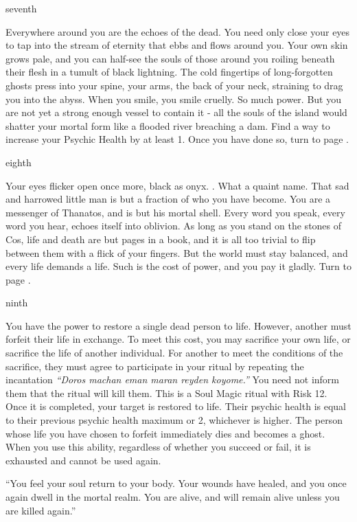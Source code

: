 \documentclass[greennotebook]{Kos}
\begin{document}
\begin{page}{seventh}

Everywhere around you are the echoes of the dead. You need only close your eyes to tap into the stream of eternity that ebbs and flows around you. Your own skin grows pale, and you can half-see the souls of those around you roiling beneath their flesh in a tumult of black lightning. The cold fingertips of long-forgotten ghosts press into your spine, your arms, the back of your neck, straining to drag you into the abyss. When you smile, you smile cruelly. So much power. But you are not yet a strong enough vessel to contain it - all the souls of the island would shatter your mortal form like a flooded river breaching a dam. Find a way to increase your Psychic Health by at least 1. Once you have done so, turn to page .

\end{page}

\begin{page}{eighth}

Your eyes flicker open once more, black as onyx. \cButler{}. What a quaint name. That sad and harrowed little man is but a fraction of who you have become. You are a messenger of Thanatos, and \cButler{} is but his mortal shell. Every word you speak, every word you hear, echoes itself into oblivion. As long as you stand on the stones of Cos, life and death are but pages in a book, and it is all too trivial to flip between them with a flick of your fingers. But the world must stay balanced, and every life demands a life. Such is the cost of power, and you pay it gladly. Turn to page .

\end{page}

\begin{page}{ninth}

You have the power to restore a single dead person to life. However, another must forfeit their life in exchange. To meet this cost, you may sacrifice your own life, or sacrifice the life of another individual. For another to meet the conditions of the sacrifice, they must agree to participate in your ritual by repeating the incantation \emph{“Doros machan eman maran reyden koyome.”} You need not inform them that the ritual will kill them. This is a Soul Magic ritual with Risk 12. Once it is completed, your target is restored to life. Their psychic health is equal to their previous psychic health maximum or 2, whichever is higher. The person whose life you have chosen to forfeit immediately dies and becomes a ghost. When you use this ability, regardless of whether you succeed or fail, it is exhausted and cannot be used again.

``You feel your soul return to your body. Your wounds have healed, and you once again dwell in the mortal realm. You are alive, and will remain alive unless you are killed again.''

\end{page}


\endnotebook
\end{document}
